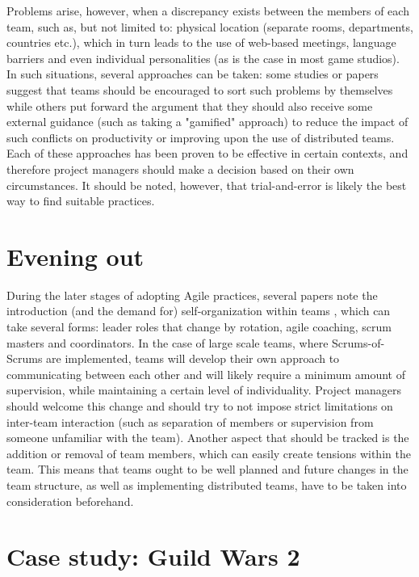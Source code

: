 \documentclass{scrartcl}
\begin{document}
    
    
    Problems arise, however, when a discrepancy exists between the members of each team, such as, but not limited to: physical location (separate rooms, departments, countries etc.), which in turn leads to the use of web-based meetings, language barriers and even individual personalities (as is the case in most game studios). In such situations, several approaches can be taken: some studies or papers suggest that teams should be encouraged to sort such problems by themselves \cite{4599458, 4599456, 4293601} while others put forward the argument that they should also receive some external guidance (such as taking a "gamified" approach) to reduce the impact of such conflicts on productivity \cite{7883385, 6475422} or improving upon the use of distributed teams. Each of these approaches has been proven to be effective in certain contexts, and therefore project managers should make a decision based on their own circumstances. It should be noted, however, that trial-and-error is likely the best way to find suitable practices.
    
    \section{Evening out}
    
    During the later stages of adopting Agile practices, several papers note the introduction (and the demand for) self-organization within teams \cite{4599458, 4599456, 6986022, 8064437, 6475422}, which can take several forms: leader roles that change by rotation, agile coaching, scrum masters and coordinators. In the case of large scale teams, where Scrums-of-Scrums are implemented, teams will develop their own approach to communicating between each other and will likely require a minimum amount of supervision, while maintaining a certain level of individuality. Project managers should welcome this change and should try to not impose strict limitations on inter-team interaction (such as separation of members or supervision from someone unfamiliar with the team). Another aspect that should be tracked is the addition or removal of team members, which can easily create tensions within the team. This means that teams ought to be well planned and future changes in the team structure, as well as implementing distributed teams, have to be taken into consideration beforehand.
    
    \section{Case study: Guild Wars 2}
    
\end{document}
